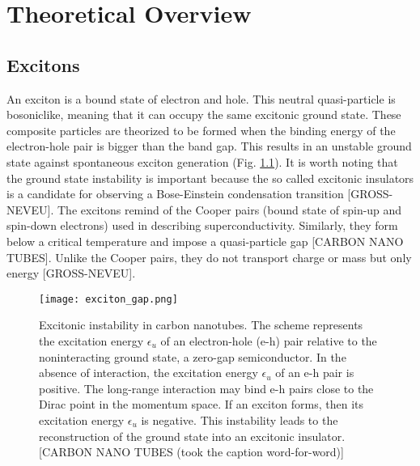 
\chapter{Theoretical Overview}
\label{sec:theory}

\section{Excitons}


An exciton is a bound state of electron and hole. This neutral quasi-particle is bosoniclike, meaning that it can occupy the same excitonic ground state. These composite particles are theorized to be formed when the binding energy of the electron-hole pair is bigger than the band gap. This results in an unstable ground state against spontaneous exciton generation (Fig. \ref{fig:exciton_gap}). It is worth noting that the ground state instability is important because the so called excitonic insulators is a candidate for observing a Bose-Einstein condensation transition [GROSS-NEVEU]. The excitons remind of the Cooper pairs (bound state of spin-up and spin-down electrons) used in describing superconductivity. Similarly, they form below a critical temperature and impose a quasi-particle gap [CARBON NANO TUBES]. Unlike the Cooper pairs, they do not transport charge or mass but only energy [GROSS-NEVEU]. 
\begin{figure}[htbp]
    \centerline{\texttt{[image: exciton\_gap.png]}}
    \caption{Excitonic instability in carbon nanotubes. The scheme represents the excitation energy $\epsilon_u$ of an electron-hole (e-h) pair relative to the noninteracting ground state, a zero-gap semiconductor. In the absence of interaction, the excitation energy $\epsilon_u$ of an e-h pair is positive. The long-range interaction may bind e-h pairs close to the Dirac point in the momentum space. If an exciton forms, then its excitation energy $\epsilon_u$ is negative. This instability leads to the reconstruction of the ground state into an excitonic insulator. [CARBON NANO TUBES (took the caption word-for-word)]}
    \label{fig:exciton_gap}
\end{figure}

